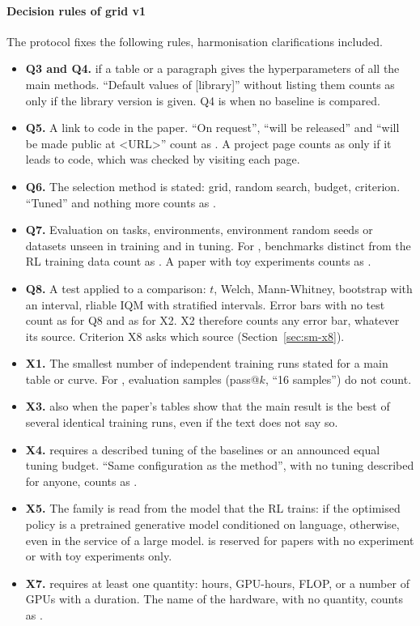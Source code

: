 \paragraph{Decision rules of grid v1}
The protocol fixes the following rules, harmonisation clarifications included.
\begin{itemize}
  \item \textbf{Q3 and Q4.}  if a table or a paragraph gives the hyperparameters of all the
  main methods. \enquote{Default values of [library]} without listing them counts as  only
  if the library version is given. Q4 is  when no baseline is compared.
  \item \textbf{Q5.} A link to code in the paper. \enquote{On request}, \enquote{will be released} and
  \enquote{will be made public at <URL>} count as . A project page counts as  only
  if it leads to code, which was checked by visiting each page.
  \item \textbf{Q6.} The selection method is stated: grid, random search, budget, criterion.
  \enquote{Tuned} and nothing more counts as .
  \item \textbf{Q7.} Evaluation on tasks, environments, environment random seeds or datasets unseen in
  training and in tuning. For , benchmarks distinct from the RL training data count as
  . A  paper with toy experiments counts as .
  \item \textbf{Q8.} A test applied to a comparison: $t$, Welch, Mann-Whitney, bootstrap with an
  interval, rliable IQM with stratified intervals. Error bars with no test count as  for Q8
  and as  for X2. X2 therefore counts any error bar, whatever its source. Criterion X8
  asks which source (Section~\ref{sec:sm-x8}).
  \item \textbf{X1.} The smallest number of independent training runs stated for a main table or
  curve. For , evaluation samples (pass@$k$, \enquote{16 samples}) do not count.
  \item \textbf{X3.}  also when the paper's tables show that the main result is the best of
  several identical training runs, even if the text does not say so.
  \item \textbf{X4.}  requires a described tuning of the baselines or an announced equal
  tuning budget. \enquote{Same configuration as the method}, with no tuning described for anyone,
  counts as .
  \item \textbf{X5.} The family is read from the model that the RL trains: 
  if the optimised policy is a pretrained generative model conditioned on language, 
  otherwise, even in the service of a large model.  is reserved for papers with no
  experiment or with toy experiments only.
  \item \textbf{X7.}  requires at least one quantity: hours, GPU-hours, FLOP, or a number of
  GPUs with a duration. The name of the hardware, with no quantity, counts as .
\end{itemize}

